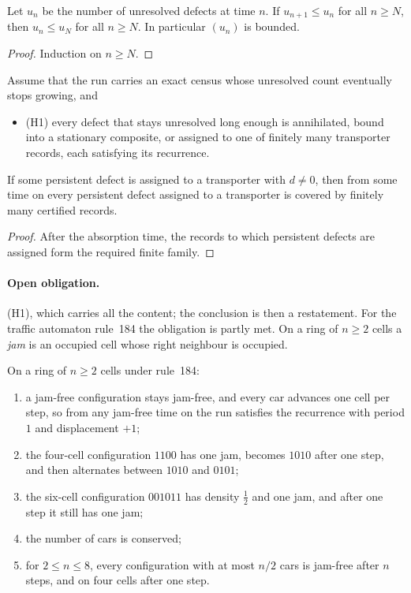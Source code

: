 \begin{theorem}\label{thm:G9-census}
Let $u_n$ be the number of unresolved defects at time $n$. If $u_{n+1} \le u_n$ for all $n \ge N$,
then $u_n \le u_N$ for all $n \ge N$. In particular $(u_n)$ is bounded.
\end{theorem}

\begin{proof}
Induction on $n \ge N$.
\end{proof}

\begin{schema}\label{thm:G9}
Assume that the run carries an exact census whose unresolved count eventually stops growing, and
\begin{itemize}
  \item \textup{(H1)} every defect that stays unresolved long enough is annihilated, bound
    into a stationary composite, or assigned to one of finitely many transporter records, each
    satisfying its recurrence.
\end{itemize}
If some persistent defect is assigned to a transporter with $d \ne 0$, then from some time on every
persistent defect assigned to a transporter is covered by finitely many certified records.
\end{schema}

\begin{proof}
After the absorption time, the records to which persistent defects are assigned form the required
finite family.
\end{proof}

\paragraph{Open obligation.} \textup{(H1)}, which carries all the content; the conclusion
is then a restatement. For the traffic automaton rule~184 the obligation is partly met. On a ring of
$n \ge 2$ cells a \emph{jam} is an occupied cell whose right neighbour is occupied.

\begin{proposition}\label{prop:rule184}
On a ring of $n \ge 2$ cells under rule~184:
\begin{enumerate}
  \item a jam-free configuration stays jam-free, and every car advances one cell per step, so from
    any jam-free time on the run satisfies the recurrence with period $1$ and displacement $+1$;
  \item the four-cell configuration $1100$ has one jam, becomes $1010$ after one step, and then
    alternates between $1010$ and $0101$;
  \item the six-cell configuration $001011$ has density $\tfrac12$ and one jam, and after one step it
    still has one jam;
  \item the number of cars is conserved;
  \item for $2 \le n \le 8$, every configuration with at most $n/2$ cars is jam-free after $n$ steps,
    and on four cells after one step.
\end{enumerate}
\end{proposition}

